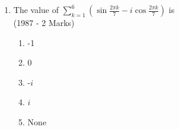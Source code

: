 \documentclass[journal,12pt,twocolumn]{IEEEtran}
\theoremstyle{remark}
\begin{document}
\begin{enumerate}
\item The value of $\sum_{k=1} ^{6} (\sin \frac{2\pi k}{7}-i\cos \frac{2\pi k}{7})$ is                        \\

	\hfill{(1987 - 2 Marks)}
		\begin{multicols}{4}
\begin{enumerate}[label=(\alph*)]
	
	\item -1
	\item 0
	\item -$i$
	\item $i$
	\item None
\end{enumerate}
		\end{multicols}

\end{enumerate}

\renewcommand{\thefigure}{\theenumi}
\renewcommand{\thetable}{\theenumi}
\end{document}
